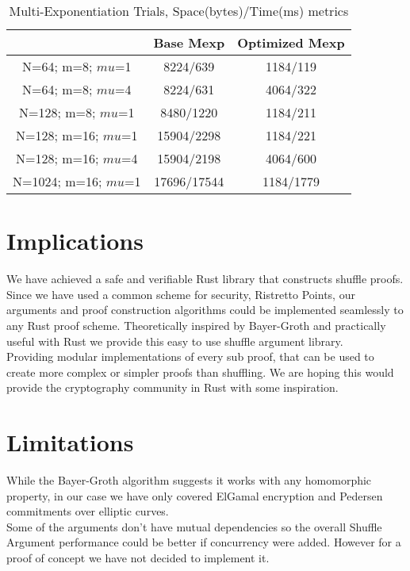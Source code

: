 \documentclass[12pt,a4paper]{report}
\begin{document}
\begin{table}
	\begin{center}
	\begin{tabular}{||c|c|c||}\hline
		\backslashbox{Parameters}{Proof Type} & Base Mexp& Optimized Mexp\\
		\hline
		N=64; m=8; $mu$=1 & 8224/639 & 1184/119\\
		\hline
		N=64; m=8; $mu$=4 & 8224/631 & 4064/322 \\
		\hline
		N=128; m=8; $mu$=1 & 8480/1220 & 1184/211\\
		\hline
		N=128; m=16; $mu$=1 & 15904/2298 & 1184/221\\
		\hline
		N=128; m=16; $mu$=4 & 15904/2198 & 4064/600\\
		\hline
		N=1024; m=16; $mu$=1 & 17696/17544 & 1184/1779\\
		\hline
	\end{tabular}
	\end{center}
	\caption{Multi-Exponentiation Trials, Space(bytes)/Time(ms) metrics}
	\label{table:mexp}
\end{table}

\section{Implications}
We have achieved a safe and verifiable Rust library that constructs shuffle proofs.
Since we have used a common scheme for security, Ristretto Points, our arguments and proof construction algorithms could be implemented seamlessly to any Rust proof scheme.
Theoretically inspired by Bayer-Groth and practically useful with Rust we provide this easy to use shuffle argument library.\\
Providing modular implementations of every sub proof, that can be used to create more complex or simpler proofs than shuffling.
We are hoping this would provide the cryptography community in Rust with some inspiration.
\section{Limitations}
While the Bayer-Groth algorithm suggests it works with any homomorphic property,
in our case we have only covered ElGamal encryption and Pedersen commitments over elliptic curves.\\
Some of the arguments don't have mutual dependencies so the overall Shuffle Argument performance
could be better if concurrency were added. However for a proof of concept we have not decided to implement it.
\end{document}
